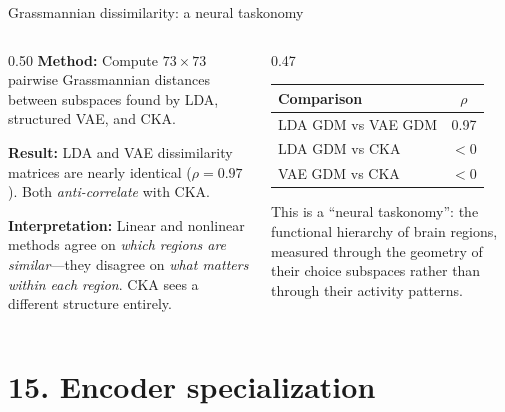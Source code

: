 \documentclass[aspectratio=169,11pt]{beamer}
\begin{document}
\begin{frame}{Grassmannian dissimilarity: a neural taskonomy}
\begin{columns}[T]
\begin{column}{0.50\textwidth}
\textbf{Method:} Compute $73 \times 73$ pairwise Grassmannian distances between subspaces found by LDA, structured VAE, and CKA.

\vspace{0.5em}
\textbf{Result:} LDA and VAE dissimilarity matrices are nearly identical ($\rho = 0.97$). Both \emph{anti-correlate} with CKA.

\vspace{0.5em}
\textbf{Interpretation:} Linear and nonlinear methods agree on \emph{which regions are similar}---they disagree on \emph{what matters within each region}. CKA sees a different structure entirely.
\end{column}

\begin{column}{0.47\textwidth}
\vspace{0.5em}
{\small
\begin{tabular}{lc}
\toprule
\textbf{Comparison} & \textbf{$\rho$} \\
\midrule
LDA GDM vs VAE GDM & 0.97 \\
LDA GDM vs CKA & $< 0$ \\
VAE GDM vs CKA & $< 0$ \\
\bottomrule
\end{tabular}
}

\vspace{0.8em}
{\small This is a ``neural taskonomy'': the functional hierarchy of brain regions, measured through the geometry of their choice subspaces rather than through their activity patterns.}
\end{column}
\end{columns}
\end{frame}

\section{15. Encoder specialization}
\end{document}
